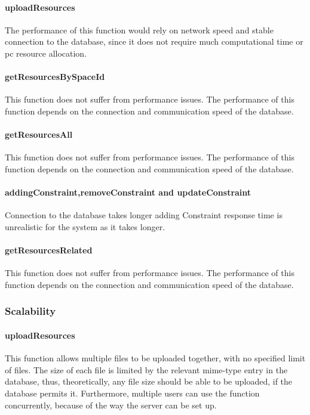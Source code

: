 \documentclass[a4paper]{article}
\begin{document}
\paragraph{uploadResources}
The performance of this function would rely on network speed and stable connection to the database, since it does not require much computational time or pc resource allocation.

\paragraph{getResourcesBySpaceId}
This function does not suffer from performance issues. The performance of this function depends on the connection and communication speed of the database.

\paragraph{getResourcesAll}
This function does not suffer from performance issues. The performance of this function depends on the connection and communication speed of the database.

\paragraph{addingConstraint,removeConstraint and updateConstraint}
Connection to the database takes longer adding Constraint response time is unrealistic for the system as it takes longer.

\paragraph{getResourcesRelated}
This function does not suffer from performance issues. The performance of this function depends on the connection and communication speed of the database.

\subsubsection {Scalability}

\paragraph{uploadResources}
This function allows multiple files to be uploaded together, with no specified limit of files. The size of each file is limited by the relevant mime-type entry in the database, thus, theoretically, any file size should be able to be uploaded, if the database permits it. Furthermore, multiple users can use the function concurrently, because of the way the server can be set up.
\end{document}
